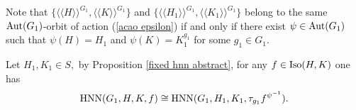 \documentclass[a4paper,12pt]{article}
\newtheorem{deff}[thm]{Definition}
\def\aut {{\rm Aut}}
\def\inn {{\rm Inn}}
\def\hnn {{\rm HNN}}
\def\Iso {{\rm Iso}}
\begin{document}
{%

Note that $\{ \langle\langle H\rangle\rangle^{G_1}
, \langle\langle K\rangle\rangle^{G_1}
 \}$ and $\{ \langle\langle H_1\rangle\rangle^{G_1}
, \langle\langle K_1\rangle\rangle^{G_1}
 \}$ belong to the same $\aut(G_1)$-orbit of action (\ref{acao epsilon}) if and only if  there exist $\psi\in \aut(G_1)$ such that $\psi(H)=H_1$ and $\psi(K)=K_1^{g_1}$ for some $g_1\in G_1.$ 

Let $H_1, K_1 \in S,$ by Proposition  \ref{fixed hnn abstract},   for any $f\in \Iso(H,K)$ one has  $$\hnn(G_1, H, K, f) \cong \hnn(G_1, H_1, K_1, \tau_{g_1}f^{\psi^{-1}}).$$ 





}
\end{document}
